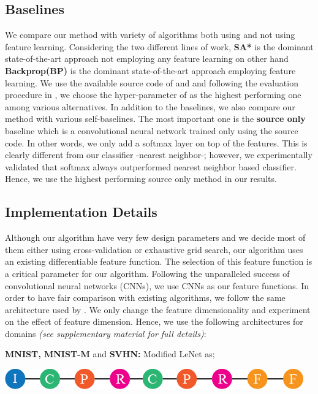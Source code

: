 \subsection{Baselines}
We compare our method with variety of algorithms both using and not using feature learning. Considering the two different lines of work, \textbf{SA*}\cite{fernando13} is the dominant state-of-the-art approach not employing any feature learning on other hand \textbf{Backprop(BP)}\cite{ganin15} is the dominant state-of-the-art approach employing feature learning. We use the available source code of \cite{ganin15} and \cite{fernando13} and following the evaluation procedure in \cite{fernando13}, we choose the hyper-parameter of \cite{fernando13} as the highest performing one among various alternatives. In addition to the baselines, we also compare our method with various self-baselines. The most important one is the \textbf{source only} baseline which is a convolutional neural network trained only using the source code. In other words, we only add a softmax layer on top of the features. This is clearly different from our classifier -nearest neighbor-; however, we experimentally validated that softmax always outperformed nearest neighbor based classifier. Hence, we use the highest performing source only method in our results.

\subsection{Implementation Details}
\label{imp_det}
Although our algorithm have very few design parameters and we decide most of them either using cross-validation or exhaustive grid search, our algorithm uses an existing differentiable feature function. The selection of this feature function is a critical parameter for our algorithm. Following the unparalleled success of convolutional neural networks (CNNs), we use CNNs as our feature functions.  In order to have  fair comparison with existing algorithms, we follow the same architecture used by \cite{ganin15}. We only change the feature dimensionality and experiment on the effect of feature dimension. Hence, we use the following architectures for domains \emph{(see supplementary material for full details)}:

\noindent \textbf{MNIST, MNIST-M} and \textbf{SVHN:} Modified LeNet\cite{lenet} as;

\includegraphics[width=\columnwidth]{lenet}


